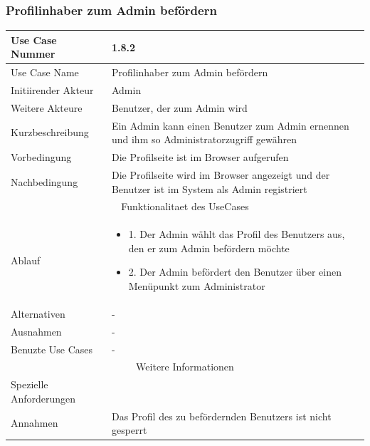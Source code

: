 \documentclass[10pt,a4paper]{article}
\begin{document}
			\subsubsection{Profilinhaber zum Admin bef\"ordern}
		\begin{tabular}{|l|p{.5\linewidth}|}
		\hline Use Case Nummer & 1.8.2 \\ 
		\hline Use Case Name & Profilinhaber zum Admin bef\"ordern \\ 
		\hline Initiirender Akteur & Admin \\
		\hline Weitere Akteure & Benutzer, der zum Admin wird \\
		\hline Kurzbeschreibung & Ein Admin kann einen Benutzer zum Admin ernennen und ihm so Administratorzugriff gew\"ahren \\
		\hline Vorbedingung & Die Profilseite ist im Browser aufgerufen \\
		\hline Nachbedingung & Die Profilseite wird im Browser angezeigt und der Benutzer ist im System als Admin registriert \\
		\hline \multicolumn{2}{|c|}{Funktionalitaet des UseCases}\\
		\hline  Ablauf & \begin{itemize}
					\item 1. Der Admin w\"ahlt das Profil des Benutzers aus, den er zum Admin bef\"ordern m\"ochte
					\item 2. Der Admin bef\"ordert den Benutzer \"uber einen Men\"upunkt zum Administrator
				\end{itemize}\\
		\hline Alternativen & - \\
		\hline Ausnahmen & - \\
		\hline Benuzte Use Cases & - \\
		\hline \multicolumn{2}{|c|}{Weitere Informationen} \\
		\hline Spezielle Anforderungen &  \\
		\hline Annahmen & Das Profil des zu bef\"ordernden Benutzers ist nicht gesperrt \\
		\hline
		\end{tabular}
		
\end{document}
